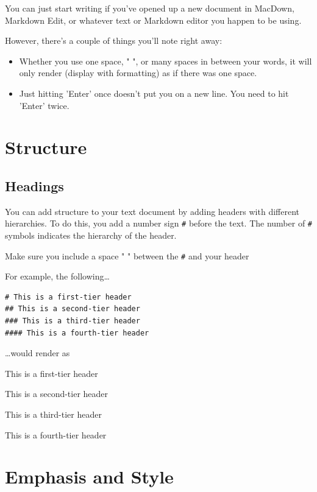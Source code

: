 \documentclass[
]{book}
\providecommand{\tightlist}{%
  \setlength{\itemsep}{0pt}\setlength{\parskip}{0pt}}
\begin{document}
You can just start writing if you've opened up a new document in MacDown, Markdown Edit, or whatever text or Markdown editor you happen to be using.

However, there's a couple of things you'll note right away:

\begin{itemize}
\tightlist
\item
  Whether you use one space, " ", or many spaces in between your words, it will only render (display with formatting) as if there was one space.
\item
  Just hitting 'Enter' once doesn't put you on a new line. You need to hit 'Enter' twice.
\end{itemize}

\hypertarget{structure-1}{%
\section{Structure}\label{structure-1}}

\hypertarget{headings}{%
\subsection*{Headings}\label{headings}}

You can add structure to your text document by adding headers with different hierarchies. To do this, you add a number sign \texttt{\#} before the text. The number of \texttt{\#} symbols indicates the hierarchy of the header.

Make sure you include a space " " between the \texttt{\#} and your header

For example, the following\ldots{}

\begin{verbatim}
# This is a first-tier header
## This is a second-tier header
### This is a third-tier header
#### This is a fourth-tier header
\end{verbatim}

\ldots would render as

This is a first-tier header

This is a second-tier header

This is a third-tier header

This is a fourth-tier header

\hypertarget{emphasis-and-style}{%
\section{Emphasis and Style}\label{emphasis-and-style}}
\end{document}
